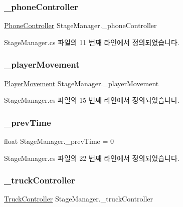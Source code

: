 \subsubsection{\texorpdfstring{\_phoneController}{\_phoneController}}
{\footnotesize\ttfamily \mbox{\hyperlink{class_phone_controller}{Phone\+Controller}} Stage\+Manager.\+\_\+phone\+Controller}



Stage\+Manager.\+cs 파일의 11 번째 라인에서 정의되었습니다.

\mbox{\label{class_stage_manager_ac6ae36d1451fad99c1a2320c975b0157}} 
\subsubsection{\texorpdfstring{\_playerMovement}{\_playerMovement}}
{\footnotesize\ttfamily \mbox{\hyperlink{class_player_movement}{Player\+Movement}} Stage\+Manager.\+\_\+player\+Movement}



Stage\+Manager.\+cs 파일의 15 번째 라인에서 정의되었습니다.

\mbox{\label{class_stage_manager_ab61fe24b15151c1255c90f1a7f2aab23}} 
\subsubsection{\texorpdfstring{\_prevTime}{\_prevTime}}
{\footnotesize\ttfamily float Stage\+Manager.\+\_\+prev\+Time = 0\hspace{0.3cm}{\ttfamily [private]}}



Stage\+Manager.\+cs 파일의 22 번째 라인에서 정의되었습니다.

\mbox{\label{class_stage_manager_acb005133cca2300f649200ad843d49bf}} 
\subsubsection{\texorpdfstring{\_truckController}{\_truckController}}
{\footnotesize\ttfamily \mbox{\hyperlink{class_truck_controller}{Truck\+Controller}} Stage\+Manager.\+\_\+truck\+Controller}



